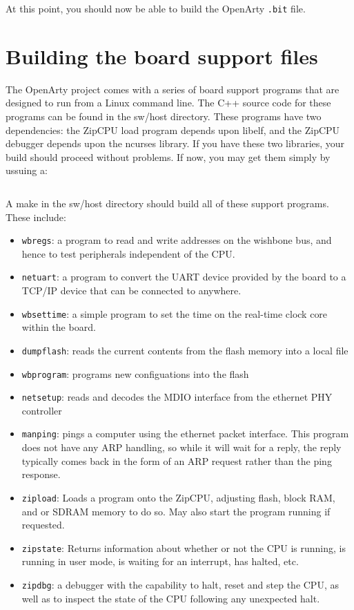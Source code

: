 \documentclass{gqtekspec}
\begin{document}
At this point, you should now be able to build the OpenArty {\tt .bit} file.

%
%
\section{Building the board support files}
The OpenArty project comes with a series of board support programs that are
designed to run from a Linux command line.  The C++ source code for these
programs can be found in the sw/host directory.  These programs have two
dependencies: the ZipCPU load program depends upon libelf, and the ZipCPU
debugger depends upon the ncurses library.  If you have these two libraries,
your build should proceed without problems.  If now, you may get them simply
by ussuing a:
\begin{lstlisting}[language=bash]
% sudo apt-get install ncurses-dev libelf-dev texinfo
\end{lstlisting}



A make in the sw/host directory should build all of these support programs.
These include:
\begin{itemize}
\item {\tt wbregs}: a program to read and write addresses on the wishbone bus,
	and hence to test peripherals independent of the CPU.
\item {\tt netuart}: a program to convert the UART device provided by the board
	to a TCP/IP device that can be connected to anywhere.
\item {\tt wbsettime}: a simple program to set the time on the real-time clock
	core within the board.
\item {\tt dumpflash}: reads the current contents from the flash memory into a
 	local file
\item {\tt wbprogram}: programs new configuations into the flash
\item {\tt netsetup}: reads and decodes the MDIO interface from the ethernet
	PHY controller
\item {\tt manping}: pings a computer using the ethernet packet interface.
	This program does not have any ARP handling, so while it will wait
	for a reply, the reply typically comes back in the form of an ARP
	request rather than the ping response.
\item {\tt zipload}: Loads a program onto the ZipCPU, adjusting flash, block
	RAM, and or SDRAM memory to do so.  May also start the program running
	if requested.
\item {\tt zipstate}: Returns information about whether or not the CPU is
	running, is running in user mode, is waiting for an interrupt,
	has halted, etc.
\item {\tt zipdbg}: a debugger with the capability to halt, reset and step
	the CPU, as well as to inspect the state of the CPU following any
	unexpected halt.
\end{itemize}
\end{document}
